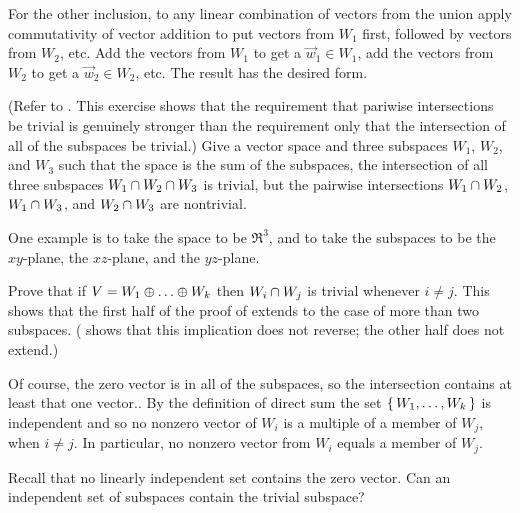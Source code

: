 \begin{exercises}
\begin{answer}
       For the other inclusion, to any linear combination of vectors from
       the union apply commutativity of vector addition to
       put vectors from \( W_1 \) first, followed by vectors from \( W_2 \), 
       etc.
       Add the vectors from \( W_1 \) to get a \( \vec{w}_1\in W_1 \),
       add the vectors from \( W_2 \) to get a \( \vec{w}_2\in W_2 \), etc.
       The result has the desired form.
     \end{answer}
  \item \label{exer:ThreeSubsPairwseNonTriv}
    (Refer to .
    This exercise 
    shows that the requirement that pariwise intersections be trivial
    is genuinely stronger than the requirement only that the intersection of
    all of the subspaces be trivial.)
    Give a vector space and three subspaces $W_1$, $W_2$, and $W_3$
    such that the space is the sum of the subspaces, 
    the intersection of all three subspaces
    $W_1\cap W_2\cap W_3$ is trivial, 
    but the pairwise intersections 
    $W_1\cap W_2$, $W_1\cap W_3$, and $W_2\cap W_3$
    are nontrivial.
    \begin{answer}
      One example is to take the space to be $\Re^3$, and to take the
      subspaces to be the $xy$-plane, the $xz$-plane, and the $yz$-plane.
    \end{answer}
  \recommended \item 
    Prove that if \( V=W_1\directsum\dots\directsum W_k \) then
    \( W_i\cap W_j \) is trivial whenever \( i\neq j \).
    This shows that the first half of the proof of 
     extends to the case of more than two
    subspaces.
    ( shows that this implication does
    not reverse; the other half does not extend.)
    \begin{answer}
      Of course, the zero vector is in all of the subspaces, so the 
      intersection contains at least that one vector..  
      By the definition of direct sum the set
      \( \mbox{$\{\,W_1,\dots,W_k\,\}$} \) is independent and so no nonzero vector
      of \( W_i \) is a multiple of a member of \( W_j \), when
      \( i\neq j \).
      In particular, no nonzero vector from \( W_i \) equals a member of
      \( W_j \).
    \end{answer}
  \item 
    Recall that no linearly independent set contains the zero vector.
    Can an independent set of subspaces contain the trivial subspace?

\end{exercises}
